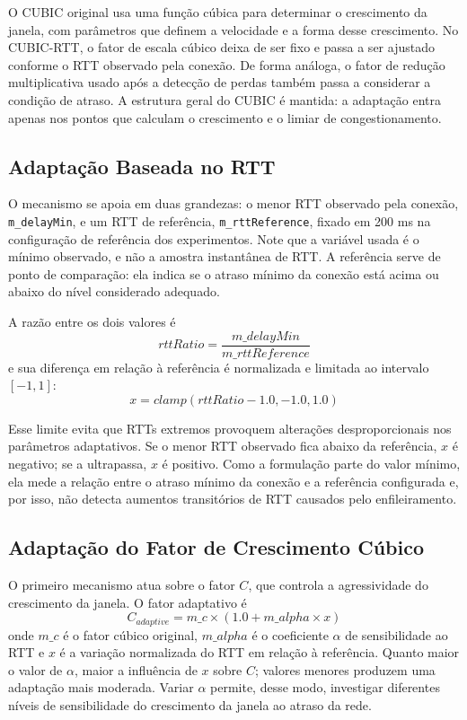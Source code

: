 \documentclass[a4paper,12pt]{monografia}
\begin{document}
O CUBIC original usa uma função cúbica para determinar o crescimento da janela, com parâmetros que definem a velocidade e a forma desse crescimento. No CUBIC-RTT, o fator de escala cúbico deixa de ser fixo e passa a ser ajustado conforme o RTT observado pela conexão. De forma análoga, o fator de redução multiplicativa usado após a detecção de perdas também passa a considerar a condição de atraso. A estrutura geral do CUBIC é mantida: a adaptação entra apenas nos pontos que calculam o crescimento e o limiar de congestionamento.

\subsection{Adaptação Baseada no RTT}

O mecanismo se apoia em duas grandezas: o menor RTT observado pela conexão, \texttt{m\_delayMin}, e um RTT de referência, \texttt{m\_rttReference}, fixado em 200 ms na configuração de referência dos experimentos. Note que a variável usada é o mínimo observado, e não a amostra instantânea de RTT. A referência serve de ponto de comparação: ela indica se o atraso mínimo da conexão está acima ou abaixo do nível considerado adequado.

A razão entre os dois valores é
\begin{equation}
rttRatio = \frac{m\_delayMin}{m\_rttReference}
\end{equation}
e sua diferença em relação à referência é normalizada e limitada ao intervalo $[-1, 1]$:
\begin{equation}
x = clamp(rttRatio - 1.0, -1.0, 1.0)
\end{equation}

Esse limite evita que RTTs extremos provoquem alterações desproporcionais nos parâmetros adaptativos. Se o menor RTT observado fica abaixo da referência, $x$ é negativo; se a ultrapassa, $x$ é positivo. Como a formulação parte do valor mínimo, ela mede a relação entre o atraso mínimo da conexão e a referência configurada e, por isso, não detecta aumentos transitórios de RTT causados pelo enfileiramento.

\subsection{Adaptação do Fator de Crescimento Cúbico}

O primeiro mecanismo atua sobre o fator $C$, que controla a agressividade do crescimento da janela. O fator adaptativo é
\begin{equation}
C_{adaptive} =
m\_c \times (1.0 + m\_alpha \times x)
\end{equation}
onde $m\_c$ é o fator cúbico original, $m\_alpha$ é o coeficiente $\alpha$ de sensibilidade ao RTT e $x$ é a variação normalizada do RTT em relação à referência. Quanto maior o valor de $\alpha$, maior a influência de $x$ sobre $C$; valores menores produzem uma adaptação mais moderada. Variar $\alpha$ permite, desse modo, investigar diferentes níveis de sensibilidade do crescimento da janela ao atraso da rede.
\end{document}

